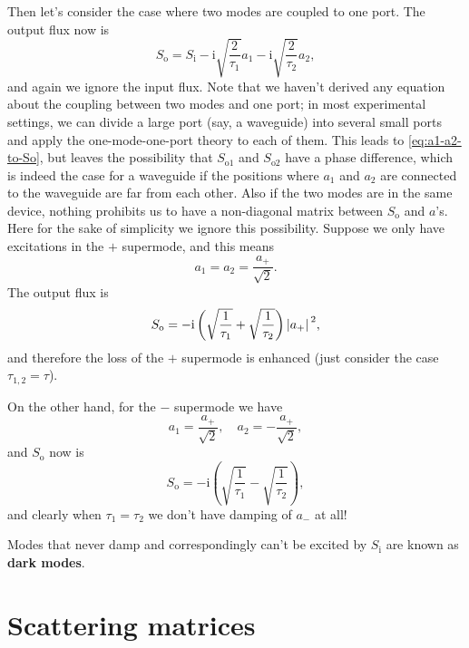 \documentclass[hyperref, a4paper]{article}
\newcommand*{\ii}{\mathrm{i}}
\newcommand*{\concept}[1]{{\textbf{#1}}}
\newcommand*{\Si}{S_{\text{i}}}
\newcommand*{\So}{S_{\text{o}}}
\begin{document}
Then let's consider the case where two modes are coupled to one port.
The output flux now is 
\begin{equation}
    \So = \Si - \ii \sqrt{\frac{2}{\tau_1}} a_1 - \ii \sqrt{\frac{2}{\tau_2}} a_2,
    \label{eq:a1-a2-to-So}
\end{equation}
and again we ignore the input flux.
Note that we haven't derived any equation about the coupling between two modes and one port; 
in most experimental settings, we can divide a large port (say, a waveguide) 
into several small ports and apply the one-mode-one-port theory to each of them.
This leads to \eqref{eq:a1-a2-to-So}, but leaves the possibility that 
$S_{\text{o1}}$ and $S_{\text{o2}}$ have a phase difference, 
which is indeed the case for a waveguide 
if the positions where $a_1$ and $a_2$ are connected to the waveguide  
are far from each other.
Also if the two modes are in the same device, 
nothing prohibits us to have a non-diagonal matrix between $\So$ and $a$'s.
Here for the sake of simplicity we ignore this possibility.
Suppose we only have excitations in the $+$ supermode,
and this means 
\begin{equation}
    a_1 = a_2 = \frac{a_+}{\sqrt{2}}.
\end{equation}
The output flux is 
\begin{equation}
    \So = - \ii \left(\sqrt{\frac{1}{\tau_1}} + \sqrt{\frac{1}{\tau_2}}\right) \abs*{a_+}^2,
\end{equation}
and therefore the loss of the $+$ supermode is enhanced 
(just consider the case $\tau_{1,2} = \tau$).

On the other hand, for the $-$ supermode we have 
\begin{equation}
    a_1 = \frac{a_+}{\sqrt{2}}, \quad a_2 = - \frac{a_+}{\sqrt{2}},
\end{equation}
and $\So$ now is 
\begin{equation}
    \So = - \ii \left( \sqrt{\frac{1}{\tau_1}} - \sqrt{\frac{1}{\tau_2}} \right),
\end{equation}
and clearly when $\tau_1 = \tau_2$ we don't have damping of $a_-$ at all!

Modes that never damp and correspondingly can't be excited by $\Si$ 
are known as \concept{dark modes}.

\section{Scattering matrices}
\end{document}
